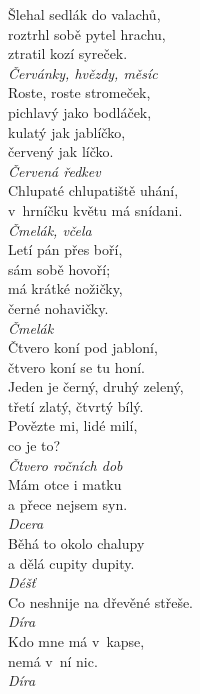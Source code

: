 \begin{multicols}{3}
\noindent
Šlehal sedlák do valachů,\\
roztrhl sobě pytel hrachu,\\
ztratil kozí syreček.\\[1 mm]
{\sl Červánky, hvězdy, měsíc}\\

\noindent
Roste, roste stromeček,\\
pichlavý jako bodláček,\\
kulatý jak jablíčko,\\
červený jak líčko.\\[1 mm]
{\sl Červená ředkev}\\

\noindent
Chlupaté chlupatiště uhání,\\
v~hrníčku květu má snídani.\\[1 mm]
{\sl Čmelák, včela}\\

\noindent
Letí pán přes boří,\\
sám sobě hovoří;\\
má krátké nožičky,\\
černé nohavičky.\\[1 mm]
{\sl Čmelák}\\

\noindent
Čtvero koní pod jabloní,\\
čtvero koní se tu honí.\\
Jeden je černý, druhý zelený,\\
třetí zlatý, čtvrtý bílý.\\
Povězte mi, lidé milí,\\
co je to?\\[1 mm]
{\sl Čtvero ročních dob}\\

\noindent
Mám otce i matku\\
a přece nejsem syn.\\[1 mm]
{\sl Dcera}\\

\noindent
Běhá to okolo chalupy\\
a dělá cupity dupity.\\[1 mm]
{\sl Déšť}\\

\noindent
Co neshnije na dřevěné střeše.\\[1 mm]
{\sl Díra}\\

\noindent
Kdo mne má v~kapse,\\
nemá v~ní nic.\\[1 mm]
{\sl Díra}\\


\end{multicols}
